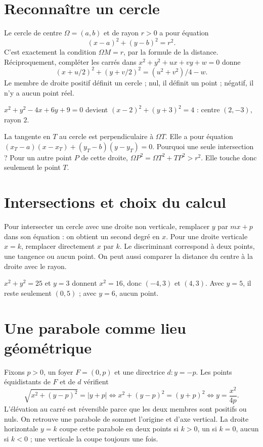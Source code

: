 \documentclass[../cours_1re.tex]{subfiles}
\begin{document}
\section{Reconnaître un cercle}
Le cercle de centre $\Omega=(a,b)$ et de rayon $r>0$ a pour équation
\[
(x-a)^2+(y-b)^2=r^2.
\]
C'est exactement la condition $\Omega M=r$, par la formule de la distance.
Réciproquement, compléter les carrés dans
$x^2+y^2+ux+vy+w=0$ donne
\[
(x+u/2)^2+(y+v/2)^2=(u^2+v^2)/4-w.
\]
Le membre de droite positif définit un cercle ; nul, il définit un point ;
négatif, il n'y a aucun point réel.
\begin{exemple}
$x^2+y^2-4x+6y+9=0$ devient $(x-2)^2+(y+3)^2=4$ :
centre $(2,-3)$, rayon $2$.
\end{exemple}
La tangente en $T$ au cercle est perpendiculaire à $\Omega T$.
Elle a pour équation
$(x_T-a)(x-x_T)+(y_T-b)(y-y_T)=0$.
Pourquoi une seule intersection ? Pour un autre point $P$ de cette droite,
$\Omega P^2=\Omega T^2+TP^2>r^2$. Elle touche donc seulement le point $T$.

\section{Intersections et choix du calcul}
Pour intersecter un cercle avec une droite non verticale, remplacer $y$
par $mx+p$ dans son équation : on obtient un second degré en $x$.
Pour une droite verticale $x=k$, remplacer directement $x$ par $k$.
Le discriminant correspond à deux points, une tangence ou aucun point.
On peut aussi comparer la distance du centre à la droite avec le rayon.
\begin{exemple}
$x^2+y^2=25$ et $y=3$ donnent $x^2=16$, donc $(-4,3)$ et $(4,3)$.
Avec $y=5$, il reste seulement $(0,5)$ ; avec $y=6$, aucun point.
\end{exemple}

\section{Une parabole comme lieu géométrique}
\approfondissement
Fixons $p>0$, un foyer $F=(0,p)$ et une directrice $d:y=-p$.
Les points équidistants de $F$ et de $d$ vérifient
\[
\sqrt{x^2+(y-p)^2}=|y+p|
\iff x^2+(y-p)^2=(y+p)^2
\iff y=\frac{x^2}{4p}.
\]
L'élévation au carré est réversible parce que les deux membres sont positifs
ou nuls. On retrouve une parabole de sommet l'origine et d'axe vertical.
La droite horizontale $y=k$ coupe cette parabole en deux points si $k>0$,
un si $k=0$, aucun si $k<0$ ; une verticale la coupe toujours une fois.
\end{document}
